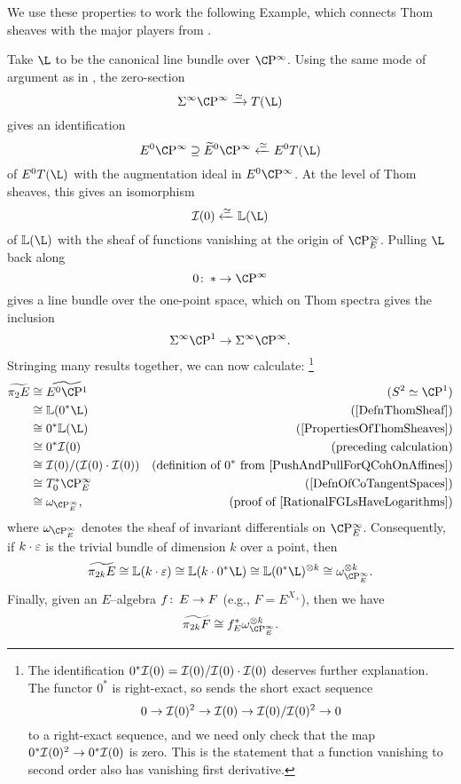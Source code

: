 We use these properties to work the following Example, which connects Thom sheaves with the major players from .

\begin{example}\label{Pi2AndInvariantDiffls}
Take $\L$ to be the canonical line bundle over $\CP^\infty$.  Using the same mode of argument as in , the zero-section \[\Susp^\infty \CP^\infty \xrightarrow{\simeq} T(\L)\] gives an identification \[E^0 \CP^\infty \supseteq \widetilde E^0 \CP^\infty \xleftarrow{\simeq} E^0 T(\L)\] of $E^0 T(\L)$ with the augmentation ideal in $E^0 \CP^\infty$.  At the level of Thom sheaves, this gives an isomorphism \[\sheaf I(0) \xleftarrow{\simeq} \ThomSheaf{\L}\] of $\ThomSheaf{\L}$ with the sheaf of functions vanishing at the origin of $\CP^\infty_E$.  Pulling $\L$ back along \[0\co * \to \CP^\infty\] gives a line bundle over the one-point space, which on Thom spectra gives the inclusion \[\Susp^\infty \CP^1 \to \Susp^\infty \CP^\infty.\]  Stringing many results together, we can now calculate:
\footnote{The identification $0^* \mathcal{I}(0) = \mathcal{I}(0) / \mathcal{I}(0) \cdot \mathcal{I}(0)$ deserves further explanation.  The functor $0^*$ is right-exact, so sends the short exact sequence \[0 \to \mathcal{I}(0)^2 \to \mathcal{I}(0) \to \mathcal{I}(0) / \mathcal{I}(0)^2 \to 0\] to a right-exact sequence, and we need only check that the map $0^* \mathcal{I}(0)^2 \to 0^* \mathcal{I}(0)$ is zero.  This is the statement that a function vanishing to second order also has vanishing first derivative.}
\begin{align*}
\widetilde{\pi_2 E} & \cong \widetilde{E^0 \CP^1} & \text{($S^2 \simeq \CP^1$)} \\
& \cong \ThomSheaf{0^* \L} & \text{(\Cref{DefnThomSheaf})} \\
& \cong 0^* \ThomSheaf{\L} & \text{(\Cref{PropertiesOfThomSheaves})} \\
& \cong 0^* \sheaf I(0) & \text{(preceding calculation)} \\
& \cong \sheaf I(0) / (\sheaf I(0) \cdot \sheaf I(0)) & \text{(definition of $0^*$ from \Cref{PushAndPullForQCohOnAffines})} \\
& \cong T^*_0 \CP^\infty_E & \text{(\Cref{DefnOfCoTangentSpaces})} \\
& \cong \omega_{\CP^\infty_E}, & \text{(proof of \Cref{RationalFGLsHaveLogarithms})}
\end{align*}
where $\omega_{\CP^\infty_E}$ denotes the sheaf of invariant differentials on $\CP^\infty_E$.  Consequently, if $k \cdot \varepsilon$ is the trivial bundle of dimension $k$ over a point, then \[\widetilde{\pi_{2k} E} \cong \ThomSheaf{k \cdot \eps} \cong \ThomSheaf{k \cdot 0^* \L} \cong \ThomSheaf{0^* \L}^{\otimes k} \cong \omega_{\CP^\infty_E}^{\otimes k}.\]  Finally, given an $E$--algebra $f \colon\thinspace E \to F$ (e.g., $F = E^{X_+}$), then we have \[\widetilde{\pi_{2k} F} \cong f_E^* \omega_{\CP^\infty_E}^{\otimes k}.\]
\end{example}

